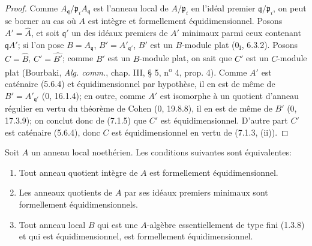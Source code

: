 \begin{proof}
Comme $A_{\mathfrak q}/\mathfrak p_iA_{\mathfrak q}$ est l'anneau local de
$A/\mathfrak p_i$ en l'idéal premier $\mathfrak q/\mathfrak p_i$, on peut
se borner au cas où $A$ est intègre et formellement équidimensionnel. Posons
$A'=\widehat A$, et soit $\mathfrak q'$ un des idéaux premiers de $A'$
minimaux parmi ceux contenant $\mathfrak qA'$; si l'on pose
$B=A_{\mathfrak q}$, $B'=A'_{\mathfrak q'}$, $B'$ est un $B$-module plat
(0$_{\mathrm I}$, 6.3.2). Posons $C=\widehat B$, $C'=\widehat {B'}$; comme
$B'$ est un $B$-module plat, on sait que $C'$ est un $C$-module plat
(Bourbaki, \emph{Alg. comm.}, chap. III, § 5, n\textsuperscript{o} 4,
prop. 4). Comme $A'$ est caténaire (5.6.4) et équidimensionnel par
hypothèse, il en est de même de $B'=A'_{\mathfrak q'}$ (0, 16.1.4); en
outre, comme $A'$ est isomorphe à un quotient d'anneau régulier en vertu du
théorème de Cohen (0, 19.8.8), il en est de même de $B'$ (0, 17.3.9); on
conclut donc de (7.1.5) que $C'$ est équidimensionnel. D'autre part $C'$ est
caténaire (5.6.4), donc $C$ est équidimensionnel en vertu de (7.1.3, (ii)).
\end{proof}

\begin{theorem}[7.1.8]
\label{IV.2.s7.1.8-fr}
Soit $A$ un anneau local noethérien. Les conditions suivantes sont
équivalentes:
\begin{enumerate}
\item[a)] Tout anneau quotient intègre de $A$ est formellement équidimensionnel.
\item[b)] Les anneaux quotients de $A$ par ses idéaux premiers minimaux sont
formellement équidimensionnels.
\item[c)] Tout anneau local $B$ qui est une $A$-algèbre essentiellement de type
fini (1.3.8) et qui est équidimensionnel, est formellement
équidimensionnel.
\end{enumerate}
\end{theorem}

